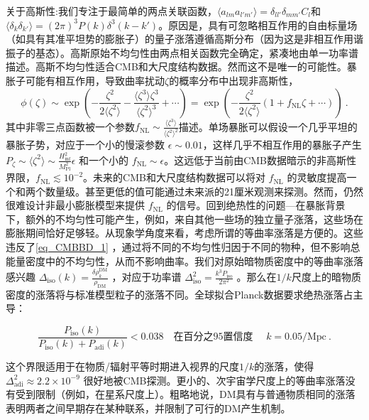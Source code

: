 关于高斯性:我们专注于最简单的两点关联函数，$\langle a_{lm}a_{l'm'}\rangle = \delta_{ll'}\delta_{mm'} C_l$和
$\langle \delta_k \delta_{k'}\rangle = (2\pi)^3 P(k)  \delta^3(k - k')$。原因是，具有可忽略相互作用的自由标量场（如具有其准平坦势的膨胀子）的量子涨落遵循高斯分布（因为这是非相互作用谐振子的基态）。高斯原始不均匀性由两点相关函数完全确定，紧凑地由单一功率谱描述。高斯不均匀性适合CMB和大尺度结构数据。然而这不是唯一的可能性。暴胀子可能有相互作用，导致曲率扰动$\zeta$的概率分布中出现非高斯性，
\begin{equation}
\phi(\zeta) \sim \exp \left( -\frac{\zeta^2}{2\langle\zeta^2\rangle} - \frac{\langle\zeta^3\rangle\zeta^3}{\langle\zeta^2\rangle^3} + \cdots \right) = \exp \left( -\frac{\zeta^2}{2\langle\zeta^2\rangle} (1 + f_{\text{NL}}\zeta + \cdots) \right) ~.
\end{equation}
其中非零三点函数被一个参数\( f_{\text{NL}} \sim \frac{\langle\zeta^3\rangle}{\langle\zeta^2\rangle^2} \)描述。单场暴胀可以假设一个几乎平坦的暴胀子势，对应于一个小的慢滚参数 \( \epsilon \sim 0.01 \)，这样几乎不相互作用的暴胀子产生 \( P_\zeta \sim \langle\zeta^2\rangle \sim \frac{H^2_{\text{inf}}}{M^2_{\text{Pl}}}\epsilon \) 和一个小的 \( f_{\text{NL}} \sim \epsilon \)。这远低于当前由CMB数据暗示的非高斯性界限，\( f_{\text{NL}} \lesssim 10^{-2} \)。未来的CMB和大尺度结构数据可以将对 \( f_{\text{NL}} \) 的灵敏度提高一个和两个数量级。甚至更低的值可能通过未来派的21厘米观测来探测。然而，仍然很难设计非最小膨胀模型来提供 \( f_{\text{NL}} \) 的信号。回到绝热性的问题—在暴胀背景下，额外的不均匀性可能产生，例如，来自其他一些场的独立量子涨落，这些场在膨胀期间恰好足够轻。从现象学角度来看，考虑所谓的等曲率涨落是方便的。这些违反了\autoref{eq_CMBBD_1} ，通过将不同的不均匀性归因于不同的物种，但不影响总能量密度中的不均匀性，从而不影响曲率。我们对原始暗物质密度中的等曲率涨落感兴趣 \( \Delta_{\text{iso}}(k) = \frac{\delta\rho_k^{\text{DM}}}{\rho_{\text{DM}}} \) ，对应于功率谱 \( \Delta^2_{\text{iso}} = \frac{k^3P_{\text{iso}}}{2\pi^2} \) 。那么在$1/k$尺度上的暗物质密度的涨落将与标准模型粒子的涨落不同。全球拟合Planck数据要求绝热涨落占主导：

\[ \frac{P_{\text{iso}}(k)}{P_{\text{iso}}(k) + P_{\text{adi}}(k)} < 0.038 \quad \text{在百分之95置信度 }\quad k = 0.05/\text{Mpc} ~. \]

这个界限适用于在物质/辐射平等时期进入视界的尺度$1/k$的涨落，使得 \( \Delta^2_{\text{adi}} \approx 2.2 \times 10^{-9} \) 很好地被CMB探测。更小的、次宇宙学尺度上的等曲率涨落没有受到限制（例如，在星系尺度上）。粗略地说，DM具有与普通物质相同的涨落表明两者之间早期存在某种联系，并限制了可行的DM产生机制。

